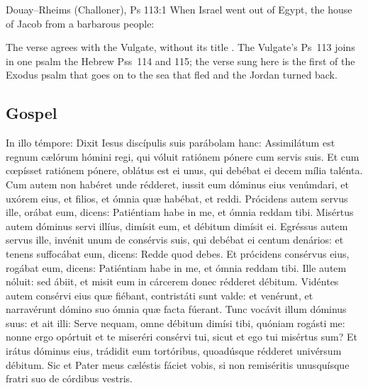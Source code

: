 \begin{englishwitness}{Douay--Rheims (Challoner), Ps 113:1}
When Israel went out of Egypt, the house of Jacob from a barbarous people:
\end{englishwitness}

\noindent The verse agrees with the Vulgate, without its title
. The Vulgate's Ps~113 joins in one psalm the Hebrew Pss~114 and
115; the verse sung here is the first of the Exodus psalm that goes on to the
sea that fled and the Jordan turned back.

\subsection{Gospel}
\label{proper-gospel}


\begin{latinproper}
In illo témpore: Dixit Iesus discípulis suis parábolam hanc: Assimilátum est
regnum cælórum hómini regi, qui vóluit ratiónem pónere cum servis suis. Et cum
cœpísset ratiónem pónere, oblátus est ei unus, qui debébat ei decem mília
talénta. Cum autem non habéret unde rédderet, iussit eum dóminus eius venúmdari,
et uxórem eius, et filios, et ómnia quæ habébat, et reddi. Prócidens autem servus
ille, orábat eum, dicens: Patiéntiam habe in me, et ómnia reddam tibi. Misértus
autem dóminus servi illíus, dimísit eum, et débitum dimísit ei. Egréssus autem
servus ille, invénit unum de consérvis suis, qui debébat ei centum denários: et
tenens suffocábat eum, dicens: Redde quod debes. Et prócidens consérvus eius,
rogábat eum, dicens: Patiéntiam habe in me, et ómnia reddam tibi. Ille autem
nóluit: sed ábiit, et misit eum in cárcerem donec rédderet débitum. Vidéntes
autem consérvi eius quæ fiébant, contristáti sunt valde: et venérunt, et
narravérunt dómino suo ómnia quæ facta fúerant. Tunc vocávit illum dóminus suus:
et ait illi: Serve nequam, omne débitum dimísi tibi, quóniam rogásti me: nonne
ergo opórtuit et te miseréri consérvi tui, sicut et ego tui misértus sum? Et
irátus dóminus eius, trádidit eum tortóribus, quoadúsque rédderet univérsum
débitum. Sic et Pater meus cæléstis fáciet vobis, si non remiséritis
unusquísque fratri suo de córdibus vestris.
\end{latinproper}

